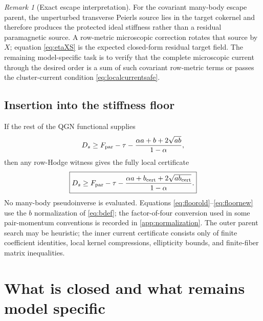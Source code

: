 \documentclass[11pt]{article}
\theoremstyle{definition}
\theoremstyle{remark}
\newtheorem{remark}[theorem]{Remark}
\begin{document}
\begin{remark}[Exact escape interpretation]
For the covariant many-body escape parent, the unperturbed transverse Peierls source lies in the target cokernel and therefore produces the protected ideal stiffness rather than a residual paramagnetic source.  A row-metric microscopic correction rotates that source by $X$; equation \eqref{eq:etaXS} is the expected closed-form residual target field.  The remaining model-specific task is to verify that the complete microscopic current through the desired order is a sum of such covariant row-metric terms or passes the cluster-current condition \eqref{eq:localcurrentsafe}.
\end{remark}

\subsection{Insertion into the stiffness floor}

If the rest of the QGN functional supplies
\begin{equation}
 D_s\ge F_{\rm par}-\tau-
 \frac{\alpha a+b+2\sqrt{ab}}{1-\alpha},
 \label{eq:floorold}
\end{equation}
then any row-Hodge witness gives the fully local certificate
\begin{equation}
 \boxed{
 D_s\ge F_{\rm par}-\tau-
 \frac{\alpha a+b_{\rm cert}+2\sqrt{a b_{\rm cert}}}{1-\alpha}.}
 \label{eq:floornew}
\end{equation}
No many-body pseudoinverse is evaluated.  Equations \eqref{eq:floorold}--\eqref{eq:floornew} use the $b$ normalization of \eqref{eq:bdef}; the factor-of-four conversion used in some pair-momentum conventions is recorded in \cref{app:normalization}.  The outer parent search may be heuristic; the inner current certificate consists only of finite coefficient identities, local kernel compressions, ellipticity bounds, and finite-fiber matrix inequalities.

\section{What is closed and what remains model specific}
\end{document}
